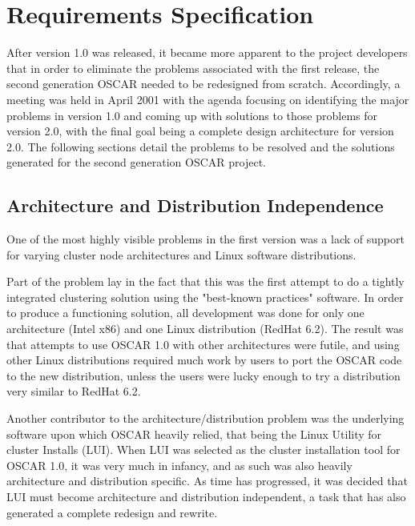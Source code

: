 %
%
%

\section{Requirements Specification}

After version 1.0 was released, it became more apparent to the project
developers that in order to eliminate the problems associated with the
first release, the second generation OSCAR needed to be redesigned
from scratch. Accordingly, a meeting was held in April 2001 with the
agenda focusing on identifying the major problems in version 1.0 and
coming up with solutions to those problems for version 2.0, with the
final goal being a complete design architecture for version 2.0. The
following sections detail the problems to be resolved and the
solutions generated for the second generation OSCAR project.

\subsection{Architecture and Distribution Independence}

One of the most highly visible problems in the first version was a
lack of support for varying cluster node architectures and Linux
software distributions.

Part of the problem lay in the fact that this was the first attempt to
do a tightly integrated clustering solution using the "best-known
practices" software. In order to produce a functioning solution, all
development was done for only one architecture (Intel x86) and one
Linux distribution (RedHat 6.2). The result was that attempts to use
OSCAR 1.0 with other architectures were futile, and using other Linux
distributions required much work by users to port the OSCAR code to
the new distribution, unless the users were lucky enough to try a
distribution very similar to RedHat 6.2.

Another contributor to the architecture/distribution problem was the
underlying software upon which OSCAR heavily relied, that being the
Linux Utility for cluster Installs (LUI). When LUI was selected as the
cluster installation tool for OSCAR 1.0, it was very much in infancy,
and as such was also heavily architecture and distribution
specific. As time has progressed, it was decided that LUI must become
architecture and distribution independent, a task that has also
generated a complete redesign and rewrite.

